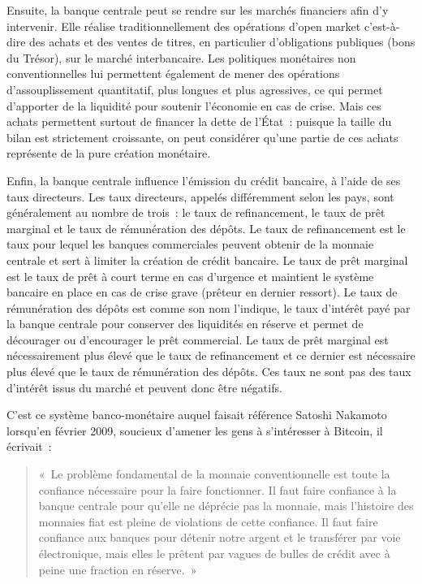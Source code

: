 Ensuite, la banque centrale peut se rendre sur les marchés financiers afin d'y intervenir. Elle réalise traditionnellement des opérations d'open market c'est-à-dire des achats et des ventes de titres, en particulier d'obligations publiques (bons du Trésor), sur le marché interbancaire. Les politiques monétaires non conventionnelles lui permettent également de mener des opérations d'assouplissement quantitatif, plus longues et plus agressives, ce qui permet d'apporter de la liquidité pour soutenir l'économie en cas de crise. Mais ces achats permettent surtout de financer la dette de l'État~: puisque la taille du bilan est strictement croissante, on peut considérer qu'une partie de ces achats représente de la pure création monétaire.

Enfin, la banque centrale influence l'émission du crédit bancaire, à l'aide de ses taux directeurs. Les taux directeurs, appelés différemment selon les pays, sont généralement au nombre de trois~: le taux de refinancement, le taux de prêt marginal et le taux de rémunération des dépôts. Le taux de refinancement est le taux pour lequel les banques commerciales peuvent obtenir de la monnaie centrale et sert à limiter la création de crédit bancaire. Le taux de prêt marginal est le taux de prêt à court terme en cas d'urgence et maintient le système bancaire en place en cas de crise grave (prêteur en dernier ressort). Le taux de rémunération des dépôts est comme son nom l'indique, le taux d'intérêt payé par la banque centrale pour conserver des liquidités en réserve et permet de décourager ou d'encourager le prêt commercial. Le taux de prêt marginal est nécessairement plus élevé que le taux de refinancement et ce dernier est nécessaire plus élevé que le taux de rémunération des dépôts. Ces taux ne sont pas des taux d'intérêt issus du marché et peuvent donc être négatifs.

C'est ce système banco-monétaire auquel faisait référence Satoshi Nakamoto lorsqu'en février 2009, soucieux d'amener les gens à s'intéresser à Bitcoin, il écrivait~:

\begin{quote}
«~Le problème fondamental de la monnaie conventionnelle est toute la confiance nécessaire pour la faire fonctionner. Il faut faire confiance à la banque centrale pour qu'elle ne déprécie pas la monnaie, mais l'histoire des monnaies fiat est pleine de violations de cette confiance. Il faut faire confiance aux banques pour détenir notre argent et le transférer par voie électronique, mais elles le prêtent par vagues de bulles de crédit avec à peine une fraction en réserve.~»
\end{quote}

